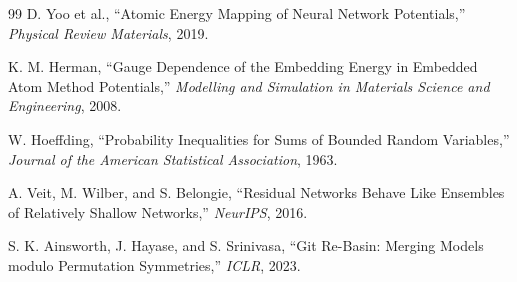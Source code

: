 \documentclass[12pt,a4paper]{article}
\theoremstyle{remark}
\begin{document}
\begin{thebibliography}{99}
D. Yoo et al.,
``Atomic Energy Mapping of Neural Network Potentials,''
\textit{Physical Review Materials}, 2019.

K. M. Herman,
``Gauge Dependence of the Embedding Energy in Embedded Atom Method Potentials,''
\textit{Modelling and Simulation in Materials Science and Engineering}, 2008.

W. Hoeffding,
``Probability Inequalities for Sums of Bounded Random Variables,''
\textit{Journal of the American Statistical Association}, 1963.

A. Veit, M. Wilber, and S. Belongie,
``Residual Networks Behave Like Ensembles of Relatively Shallow Networks,''
\textit{NeurIPS}, 2016.

S. K. Ainsworth, J. Hayase, and S. Srinivasa,
``Git Re-Basin: Merging Models modulo Permutation Symmetries,''
\textit{ICLR}, 2023.

\end{thebibliography}
\end{document}
